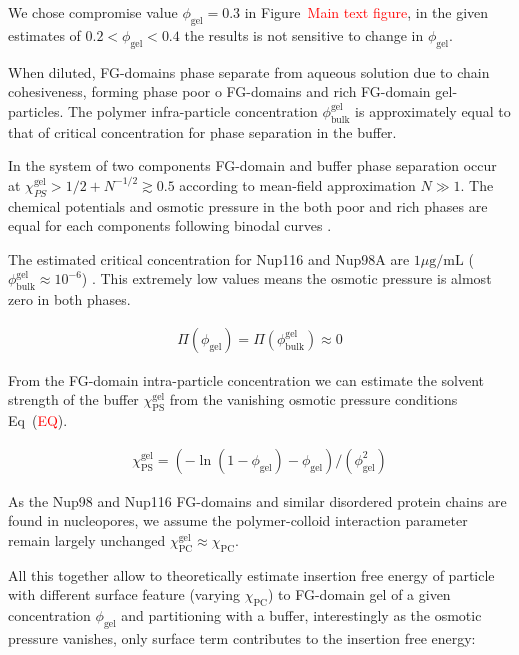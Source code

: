\documentclass[10pt, a4paper]{article}
\newcommand\todo[1]{\textcolor{red}{#1}}
\begin{document}
\begin{multicols}{2}
We chose compromise value $\phi_{\text{gel}} = 0.3$ in Figure~\todo{Main text figure}, in the given estimates of $0.2 < \phi_{\text{gel}} < 0.4$ the results is not sensitive to change in $\phi_{\text{gel}}$.

When diluted, FG-domains phase separate from aqueous solution due to chain cohesiveness, forming phase poor o FG-domains and rich FG-domain gel-particles. 
The polymer infra-particle concentration $\phi_{\text{bulk}}^{\text{gel}}$ is approximately equal to that of critical concentration for phase separation in the buffer.


In the system of two components FG-domain and buffer phase separation occur at $\chi_{PS}^{\text{gel}} > 1/2 + N^{-1/2} \gtrsim  0.5$ according to mean-field approximation $N \gg 1$.
The chemical potentials and osmotic pressure in the both poor and rich phases are equal for each components following binodal curves \cite{Vovk2016, Zilman2018}.

The estimated critical concentration for Nup116 and Nup98A are $1 \mu\text{g}/\text{mL}$ ($\phi_{\text{bulk}}^{\text{gel}} \approx 10^{-6}$) \cite{Schmidt2015}.
This extremely low values means the osmotic pressure is almost zero in both phases.

\begin{eqnarray}
    \Pi(\phi_{\text{gel}}) = \Pi(\phi_{\text{bulk}}^{\text{gel}}) \approx 0
\end{eqnarray}

From the FG-domain intra-particle concentration we can estimate the solvent strength of the buffer $\chi_{\text{PS}}^{\text{gel}}$ from the vanishing osmotic pressure conditions Eq~(\todo{EQ}).

\begin{eqnarray}
    \chi_{\text{PS}}^{\text{gel}}=(-\ln(1-\phi_{\text{gel}}) - \phi_{\text{gel}})/(\phi_{\text{gel}}^{2})
\end{eqnarray}

As the Nup98 and Nup116 FG-domains and similar disordered protein chains are found in nucleopores, we assume the polymer-colloid interaction parameter remain largely unchanged $\chi_{\text{PC}}^{\text{gel}} \approx \chi_{\text{PC}}$.

All this together allow to theoretically estimate insertion free energy of particle with different surface feature (varying $\chi_{\text{PC}}$) to FG-domain gel of a given concentration $\phi_{\text{gel}}$ and partitioning with a buffer, interestingly as the osmotic pressure vanishes, only surface term contributes to the insertion free energy:


\end{multicols}
\end{document}
